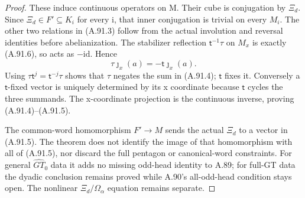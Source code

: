\begin{proof}
These induce continuous operators on M. Their cube is
conjugation by \(\Xi_d\). Since
\(\Xi_d\in F'\subseteq K_i\) for every i, that inner
conjugation is trivial on every \(M_i\).
The other two relations in (A.91.3) follow from the actual
involution and reversal identities before abelianization.
The stabilizer reflection \(\mathsf t^{-1}\tau\) on
\(M_x\) is exactly (A.91.6), so acts as \(-\mathrm{id}\).
Hence
\[
                 \tau\jmath_x(a)=-\mathsf t\jmath_x(a).
 \tag{A.91.11}
\]
Using \(\tau\mathsf t^j=\mathsf t^{-j}\tau\)
shows that \(\tau\) negates the sum in (A.91.4);
\(\mathsf t\) fixes it. Conversely a \(\mathsf t\)-fixed
vector is uniquely determined by its x coordinate because
\(\mathsf t\) cycles the three summands. The x-coordinate
projection is the continuous inverse, proving (A.91.4)--(A.91.5).

The common-word homomorphism \(F'\to M\) sends the actual
\(\Xi_d\) to a vector in (A.91.5). The theorem does not
identify the image of that homomorphism with all of
(A.91.5), nor discard the full pentagon or canonical-word
constraints. For general \(\widehat{GT}_0\) data it adds
no missing odd-head identity to A.89; for full-GT data
the dyadic conclusion remains proved while A.90's
all-odd-head condition stays open. The nonlinear
\(\Xi_d/\Omega_\alpha\) equation remains separate.
\end{proof}
